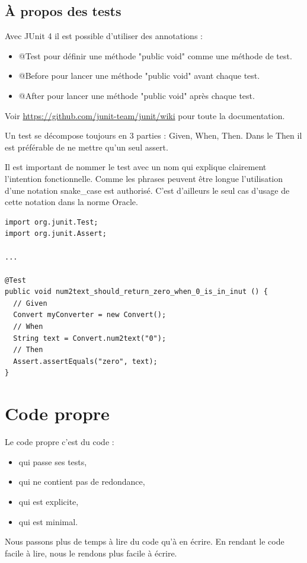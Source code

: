 \documentclass[a4paper]{article}
\begin{document}
\subsection*{À propos des tests}
Avec JUnit 4 il est possible d'utiliser des annotations : 
\begin{itemize}
  \item @Test pour définir une méthode "public void" comme une méthode de test.
  \item @Before pour lancer une méthode "public void" avant chaque test.
  \item @After pour lancer une méthode "public void" après chaque test.
\end{itemize}
Voir \url{https://github.com/junit-team/junit/wiki} pour toute la documentation.

Un test se décompose toujours en 3 parties : Given, When, Then. Dans le Then il est préférable de ne mettre qu'un seul assert.

Il est important de nommer le test avec un nom qui explique clairement l'intention fonctionnelle. Comme les phrases peuvent être longue l'utilisation d'une notation snake\_case est authorisé. C'est d'ailleurs le seul cas d'usage de cette notation dans la norme Oracle.

\begin{verbatim}
import org.junit.Test;
import org.junit.Assert;

...

@Test
public void num2text_should_return_zero_when_0_is_in_inut () {
  // Given
  Convert myConverter = new Convert();
  // When
  String text = Convert.num2text("0");
  // Then
  Assert.assertEquals("zero", text);
}
\end{verbatim}

\section*{Code propre}

Le code propre c’est du code :
\begin{itemize}
\item qui passe ses tests,
\item qui ne contient pas de redondance,
\item qui est explicite,
\item qui est minimal.
\end{itemize}

Nous passons plus de temps à lire du code qu’à en écrire. En rendant le
code facile à lire, nous le rendons plus facile à écrire.
\end{document}
